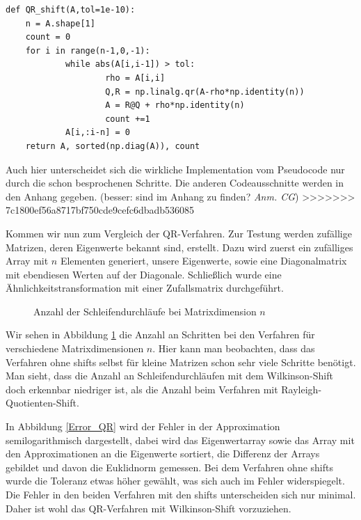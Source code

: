 \documentclass{article}
\begin{document}
\begin{theorem}
\begin{lstlisting}
def QR_shift(A,tol=1e-10):
	n = A.shape[1]
	count = 0
	for i in range(n-1,0,-1):
			while abs(A[i,i-1]) > tol:
					rho = A[i,i]
					Q,R = np.linalg.qr(A-rho*np.identity(n))
					A = R@Q + rho*np.identity(n)
					count +=1
			A[i,:i-n] = 0
	return A, sorted(np.diag(A)), count
\end{lstlisting}

Auch hier unterscheidet sich die wirkliche Implementation vom Pseudocode nur durch die schon besprochenen Schritte. Die anderen Codeausschnitte werden in den Anhang gegeben. (besser: sind im Anhang zu finden? \textit{Anm. CG})
>>>>>>> 7c1800ef56a8717bf750cde9cefc6dbadb536085

Kommen wir nun zum Vergleich der QR-Verfahren. Zur Testung werden zufällige Matrizen, deren Eigenwerte bekannt sind, erstellt. Dazu wird zuerst ein zufälliges Array mit $n$ Elementen generiert, unsere Eigenwerte, sowie eine Diagonalmatrix mit ebendiesen Werten auf der Diagonale. Schließlich wurde eine Ähnlichkeitstransformation mit einer Zufallsmatrix durchgeführt.

\begin{figure}[H]
  \centering
  \qquad
  \caption{Anzahl der Schleifendurchläufe bei Matrixdimension $n$}%
  \label{Schleifendurchläufe}
\end{figure}

Wir sehen in Abbildung \ref{Schleifendurchläufe} die Anzahl an Schritten bei den Verfahren für verschiedene Matrixdimensionen $n$. Hier kann man beobachten, dass das Verfahren ohne shifts selbst für kleine Matrizen schon sehr viele Schritte benötigt.  Man sieht, dass die Anzahl an Schleifendurchläufen mit dem Wilkinson-Shift doch erkennbar niedriger ist, als die Anzahl beim Verfahren mit Rayleigh-Quotienten-Shift.

In Abbildung \ref{Error_QR} wird der Fehler in der Approximation semilogarithmisch dargestellt, dabei wird das Eigenwertarray sowie das Array mit den Approximationen an die Eigenwerte sortiert, die Differenz der Arrays gebildet und davon die Euklidnorm gemessen. Bei dem Verfahren ohne shifts wurde die Toleranz etwas höher gewählt, was sich auch im Fehler widerspiegelt. Die Fehler in den beiden Verfahren mit den shifts unterscheiden sich nur minimal. Daher ist wohl das QR-Verfahren mit Wilkinson-Shift vorzuziehen.



\end{theorem}
\end{document}
